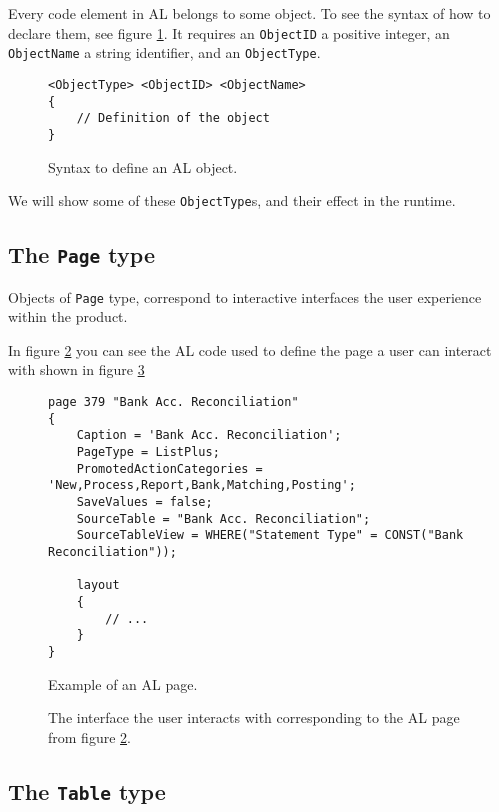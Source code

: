 Every code element in AL belongs to some object. To see the syntax of how to declare them, see figure \ref{f:appendix-alobject}.
It requires an \texttt{ObjectID} a positive integer, an \texttt{ObjectName} a string identifier, and an \texttt{ObjectType}.

\begin{figure}
    \begin{Verbatim}[fontsize=\small]
<ObjectType> <ObjectID> <ObjectName>
{
    // Definition of the object
}
    \end{Verbatim}
    \caption{Syntax to define an AL object.}
    \label{f:appendix-alobject}
\end{figure}

We will show some of these \texttt{ObjectType}s, and their effect in the runtime.

\subsection{The \texttt{Page} type}

Objects of \texttt{Page} type, correspond to interactive interfaces the user experience within the product.

In figure \ref{f:app-al-page-alcode} you can see the AL code used to define the page a user can interact with 
shown in figure \ref{f:app-al-page}

\begin{figure}
    \begin{Verbatim}[fontsize=\small]
page 379 "Bank Acc. Reconciliation"
{
    Caption = 'Bank Acc. Reconciliation';
    PageType = ListPlus;
    PromotedActionCategories = 'New,Process,Report,Bank,Matching,Posting';
    SaveValues = false;
    SourceTable = "Bank Acc. Reconciliation";
    SourceTableView = WHERE("Statement Type" = CONST("Bank Reconciliation"));

    layout
    {
        // ...
    }
}
    \end{Verbatim}
    \caption{Example of an AL page.}
    \label{f:app-al-page-alcode}
\end{figure}

\begin{figure}
    \caption{The interface the user interacts with corresponding to the AL page from figure \ref{f:app-al-page-alcode}.}
    \label{f:app-al-page}
\end{figure}

\subsection{The \texttt{Table} type}

